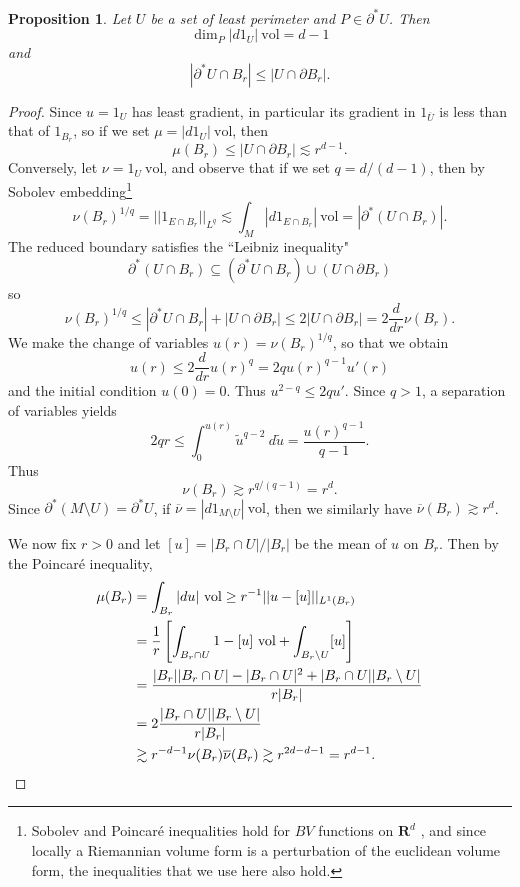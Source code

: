 \documentclass[reqno,12pt,letterpaper]{amsart}
\newcommand{\RR}{\mathbf{R}}
\newcommand{\vol}{\mathrm{vol}}
\newtheorem{proposition}[theorem]{Proposition}
\theoremstyle{definition}
\numberwithin{equation}{section}
\begin{document}
\begin{proposition}\label{doubling dimension}
Let $U$ be a set of least perimeter and $P \in \partial^* U$. Then
$$\dim_P |d1_U|~\vol = d - 1$$
and
$$|\partial^* U \cap B_r| \leq |U \cap \partial B_r|.$$
\end{proposition}
\begin{proof}
Since $u = 1_U$ has least gradient, in particular its gradient in $1_{\overline U}$ is less than that of $1_{B_r}$, so if we set $\mu =|d1_U| ~\vol$, then
$$\mu(B_r) \leq |U \cap \partial B_r| \lesssim r^{d - 1}.$$
Conversely, let $\nu = 1_U ~\vol$, and observe that if we set $q = d/(d - 1)$, then by Sobolev embedding\footnote{Sobolev and Poincar\'e inequalities hold for $BV$ functions on $\RR^d$ \cite[\S5.6.1]{evans1991measure},
and since locally a Riemannian volume form is a perturbation of the euclidean volume form, the inequalities that we use here also hold.}
$$\nu(B_r)^{1/q} = ||1_{E \cap B_r}||_{L^q} \lesssim \int_M |d1_{E \cap B_r}| ~\vol = |\partial^*(U \cap B_r)|.$$
The reduced boundary satisfies the ``Leibniz inequality"
$$\partial^*(U \cap B_r) \subseteq (\partial^* U \cap B_r) \cup (U \cap \partial B_r)$$
so
$$\nu(B_r)^{1/q} \leq |\partial^* U \cap B_r| + |U \cap \partial B_r| \leq 2|U \cap \partial B_r| = 2\frac{d}{dr} \nu(B_r).$$
We make the change of variables $u(r) = \nu(B_r)^{1/q}$, so that we obtain
$$u(r) \leq 2 \frac{d}{dr} u(r)^q = 2qu(r)^{q - 1}u'(r)$$
and the initial condition $u(0) = 0$. Thus $u^{2 - q} \leq 2qu'$.
Since $q > 1$, a separation of variables yields
$$2qr \leq \int_0^{u(r)} \tilde u^{q - 2}~d\tilde u = \frac{u(r)^{q - 1}}{q - 1}.$$
Thus
$$\nu(B_r) \gtrsim r^{q/(q - 1)} = r^d.$$
Since $\partial^* (M \setminus U) = \partial^* U$, if $\overline{\nu} = |d1_{M \setminus U}| ~\vol$, then we similarly have $\overline{\nu}(B_r) \gtrsim r^d$.

We now fix $r > 0$ and let $[u] = |B_r \cap U|/|B_r|$ be the mean of $u$ on $B_r$. Then by the Poincar\'e inequality,
\begin{align*}
\mu(B_r) &= \int_{B_r} |du|~\vol \geq r^{-1} ||u - [u]||_{L^1(B_r)} \\
&= \frac{1}{r} \left[\int_{B_r \cap U} 1 -[u] ~\vol + \int_{B_r \setminus U} [u] \right] \\
&= \frac{|B_r||B_r \cap U| - |B_r \cap U|^2 + |B_r \cap U||B_r \setminus U|}{r|B_r|} \\
&= 2\frac{|B_r \cap U||B_r \setminus U|}{r|B_r|}\\
&\gtrsim r^{-d-1} \nu(B_r) \overline{\nu}(B_r) \gtrsim r^{2d-d-1} = r^{d - 1}. \qedhere
\end{align*}
\end{proof}
\end{document}
